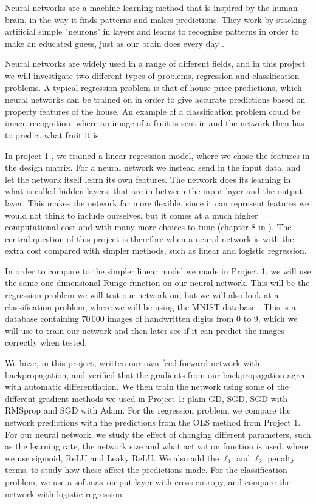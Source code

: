 \documentclass[reprint,english,notitlepage, floatfix]{revtex4-2}  %
\begin{document}
    Neural networks are a machine learning method that is inspired by the human brain, in the way it finds patterns and makes predictions. They work by stacking artificial simple "neurons" in layers and learns to recognize patterns in order to make an educated guess, just as our brain does every day \cite{IBM_neural_networks}. 
    
    Neural networks are widely used in a range of different fields, and in this project we will investigate two different types of problems, regression and classification problems. A typical regression problem is that of house price predictions, which neural networks can be trained on in order to give accurate predictions based on property features of the house. An example of a classification problem could be image recognition, where an image of a fruit is sent in and the network then has to predict what fruit it is. 
    
    In project 1 \cite{p1}, we trained a linear regression model, where we chose the features in the design matrix. For a neural network we instead send in the input data, and let the network itself learn its own features. The network does its learning in what is called hidden layers, that are in-between the input layer and the output layer. This makes the network far more flexible, since it can represent features we would not think to include ourselves, but it comes at a much higher computational cost and with many more choices to tune (chapter 8 in \cite{lecture_book}). The central question of this project is therefore when a neural network is with the extra cost compared with simpler methods, such as linear and logistic regression.
    
    In order to compare to the simpler linear model we made in Project 1, we will use the same one-dimensional Runge function on our neural network. This will be the regression problem we will test our network on, but we will also look at a classification problem, where we will be using the MNIST database \cite{MNIST}. This is a database containing $70\,000$ images of handwritten digits from 0 to 9, which we will use to train our network and then later see if it can predict the images correctly when tested. 
    
    We have, in this project, written our own feed-forward network with backpropagation, and verified that the gradients from our backpropagation agree with automatic differentiation. We then train the network using some of the different gradient methods we used in Project 1: plain GD, SGD, SGD with RMSprop and SGD with Adam. For the regression problem, we compare the network predictions with the predictions from the OLS method from Project 1. For our neural network, we study the effect of changing different parameters, such as the learning rate, the network size and what activation function is used, where we use sigmoid, ReLU and Leaky ReLU. We also add the $\ell_1$ and $\ell_2$ penalty terms, to study how these affect the predictions made. For the classification problem, we use a softmax output layer with cross entropy, and compare the network with logistic regression. 
    
\end{document}
